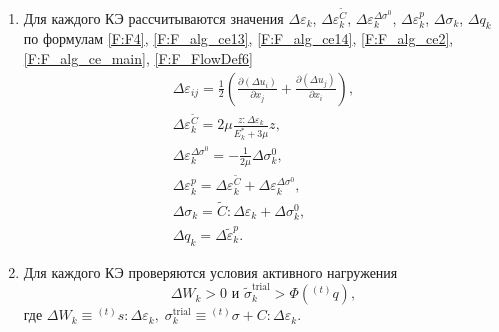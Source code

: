 \documentclass[]{article}
\begin{document}
\begin{enumerate}
	\item
	Для каждого КЭ рассчитываются значения $\Delta\varepsilon_k$, $\Delta\varepsilon_k^{\tilde{C}}$, $\Delta\varepsilon_k^{\Delta\sigma^0}$, $\Delta\varepsilon_k^p$, $\Delta\sigma_k$, $\Delta q_k$ по формулам \eqref{F:F4}, \eqref{F:F_alg_ce13}, \eqref{F:F_alg_ce14}, \eqref{F:F_alg_ce2}, \eqref{F:F_alg_ce_main}, \eqref{F:F_FlowDef6}
	\begin{equation}
	\begin{gathered}
	\Delta\varepsilon_{ij}=\frac{1}{2} \left(\frac{\partial\left( \Delta u_i\right) }{\partial x_{j}} + \frac{\partial \left( \Delta u_j\right) }{\partial x_{i}} \right),\\
	\Delta\varepsilon_k^{\tilde{C}}=2\mu\frac{z:\Delta\varepsilon_{k}}{E_{k}^{*}+3\mu}z,\\
	\Delta\varepsilon_k^{\Delta\sigma^{0}}=-\frac{1}{2\mu}\Delta\sigma_k^{0},\\
	\Delta\varepsilon_k^p=\Delta\varepsilon_k^{\tilde {C}}+\Delta\varepsilon_k^{\Delta\sigma^0},\\
	\Delta\sigma_k=\tilde{C}:\Delta\varepsilon_k+\Delta\sigma_k^{0},\\
	\Delta q_k=\Delta\tilde{\varepsilon}_k^p.
	\label{F:F_algoritm7}
	\end{gathered}
	\end{equation}
	
	
	
	
	\item
	Для каждого КЭ проверяются условия активного нагружения
	\begin{equation}
	\Delta W_k>0 \mbox{ и } \tilde{\sigma}_k^{\mathrm{trial}}>\Phi\left({}^{(t)}q\right),
	\label{F:F_algoritm_ep_active_condition}
	\end{equation}
	где
	$\Delta W_k\equiv{}^{(t)}s:\Delta\varepsilon_k,\;\sigma_k^{\mathrm{trial}}\equiv{}^{(t)}\sigma+C:\Delta\varepsilon_k.$
	

\end{enumerate}
\end{document}
